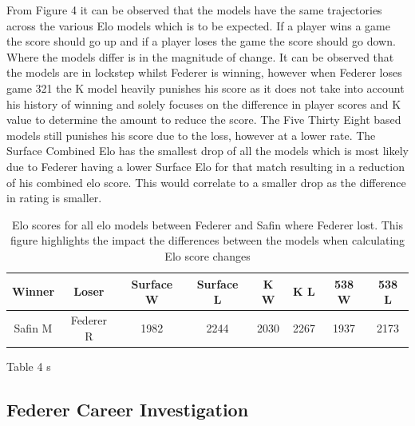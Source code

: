 \documentclass[12pt,a4paper]{article}
\begin{document}
From Figure 4 it can be observed that the models have the same trajectories across the
various Elo models which is to be expected. If a player wins a game the score should go
up and if a player loses the game the score should go down. Where the models differ is
in the magnitude of change. It can be observed that the models are in lockstep whilst
Federer is winning, however when Federer loses game 321 the K model heavily punishes
his score as it does not take into account his history of winning and solely focuses on
the difference in player scores and K value to determine the amount to reduce the score.
The Five Thirty Eight based models still punishes his score due to the loss, however at a
lower rate. The Surface Combined Elo has the smallest drop of all the models which is most
likely due to Federer having a lower Surface Elo for that match resulting in a reduction
of his combined elo score. This would correlate to a smaller drop as the difference in
rating is smaller.

\begin{table}[h]
  \begin{tabular}{||c c c c c c c c||}
    \hline
    Winner  & Loser     & Surface W & Surface L & K W  & K L  & 538 W & 538 L \\
    \hline\hline
    Safin M & Federer R & 1982      & 2244      & 2030 & 2267 & 1937  & 2173  \\
    \hline
  \end{tabular}
  \caption{Elo scores for all elo models between Federer and Safin where Federer lost.
    This figure highlights the impact the differences between the models when calculating
    Elo score changes}
\end{table}

Table 4 s

\subsection{Federer Career Investigation}
\end{document}
